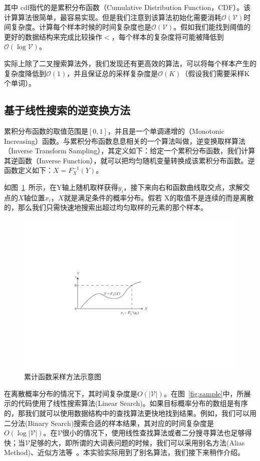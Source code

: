 其中 cdf指代的是累积分布函数（Cumulative Distribution Function，CDF）。该计算算法很简单，最容易实现。但是我们注意到该算法初始化需要消耗$\mathcal{O(\mathcal{V})}$时间复杂度。计算每个样本时候的时间复杂度也是$\mathcal{O(V)}$。假如我们能找到阈值的更好的数据结构来完成比较操作$<$，每个样本的复杂度将可能被降低到$\mathcal{O}(\log\mathcal{V})$。

实际上除了二叉搜索算法外，我们发现还有更高效的算法，可以将每个样本产生的复杂度降低到$\mathcal {O}(1)$，并且保证总的采样复杂度是$\mathcal{O}(K)$（假设我们需要采样K个单词）。
\subsection{基于线性搜索的逆变换方法}
累积分布函数的取值范围是$[0,1]$，并且是一个单调递增的（Monotonic Increasing）函数。与累积分布函数息息相关的一个算法叫做，逆变换取样算法（Inverse Transform Sampling），其定义如下：给定一个累积分布函数，我们计算其逆函数（Inverse Function），就可以把均匀随机变量转换成该累积分布函数。逆函数定义如下：$X=F_X^{-1}(Y)$。

如图~\ref{fig:cdf}~所示，在Y轴上随机取样获得$y_i$，接下来向右和函数曲线取交点，求解交点的$X$轴位置$x_i$，$X$就是满足条件的概率分布。假若 X的取值不是连续的而是离散的，那么我们只需快速地搜索出超过均匀取样的元素的那个样本。
\begin{figure}[!h]
  \centering
\includegraphics[width=0.6\linewidth]{./figures/inverse.pdf}
\caption{累计函数采样方法示意图}\label{fig:cdf}
\end{figure}

在离散概率分布的情况下，其时间复杂度是$O( |\mathcal{V}|)$。在图~\ref{fig:sample}中，所展示的代码使用了线性搜索算法(Linear Search)。如果目标概率分布的数组是有序的，那我们就可以使用数据结构中的查找算法更快地找到结果。例如，我们可以用二分法(Binary Search)搜索合适的样本结果，其对应的时间复杂度是~$O(\log |\mathcal{V}|)$。在$\mathcal{V}$很小的情况下，使用线性查找算法或者二分搜寻算法也足够得快；当$\mathcal{V}$足够的大，即所谓的大词表问题的时候，我们可以采用别名方法(Alias Method)、近似方法等~。本实验实际用到了别名算法，我们接下来稍作介绍。
